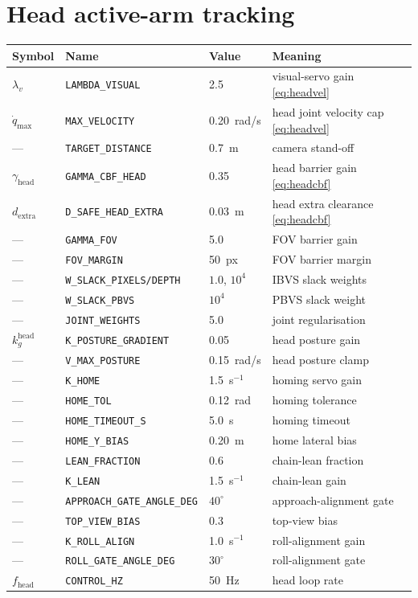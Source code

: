 \documentclass[12pt,a4paper,twoside,openright]{report}
\newcommand{\qdot}{\dot{q}}
\begin{document}
\section{Head active-arm tracking}
\begin{tabularx}{\linewidth}{@{}lllX@{}}
\toprule
Symbol & Name & Value & Meaning \\
\midrule
$\lambda_v$ & \texttt{LAMBDA\_VISUAL} & 2.5 & visual-servo gain \eqref{eq:headvel} \\
$\qdot_{\max}$ & \texttt{MAX\_VELOCITY} & 0.20~rad/s & head joint velocity cap \eqref{eq:headvel} \\
--- & \texttt{TARGET\_DISTANCE} & 0.7~m & camera stand-off \\
$\gamma_{\text{head}}$ & \texttt{GAMMA\_CBF\_HEAD} & 0.35 & head barrier gain \eqref{eq:headcbf} \\
$d_{\text{extra}}$ & \texttt{D\_SAFE\_HEAD\_EXTRA} & 0.03~m & head extra clearance \eqref{eq:headcbf} \\
--- & \texttt{GAMMA\_FOV} & 5.0 & FOV barrier gain \\
--- & \texttt{FOV\_MARGIN} & 50~px & FOV barrier margin \\
--- & \texttt{W\_SLACK\_PIXELS/DEPTH} & $1.0$, $10^{4}$ & IBVS slack weights \\
--- & \texttt{W\_SLACK\_PBVS} & $10^{4}$ & PBVS slack weight \\
--- & \texttt{JOINT\_WEIGHTS} & 5.0 & joint regularisation \\
$k_g^{\text{head}}$ & \texttt{K\_POSTURE\_GRADIENT} & 0.05 & head posture gain \\
--- & \texttt{V\_MAX\_POSTURE} & 0.15~rad/s & head posture clamp \\
--- & \texttt{K\_HOME} & 1.5~s$^{-1}$ & homing servo gain \\
--- & \texttt{HOME\_TOL} & 0.12~rad & homing tolerance \\
--- & \texttt{HOME\_TIMEOUT\_S} & 5.0~s & homing timeout \\
--- & \texttt{HOME\_Y\_BIAS} & 0.20~m & home lateral bias \\
--- & \texttt{LEAN\_FRACTION} & 0.6 & chain-lean fraction \\
--- & \texttt{K\_LEAN} & 1.5~s$^{-1}$ & chain-lean gain \\
--- & \texttt{APPROACH\_GATE\_ANGLE\_DEG} & $40^{\circ}$ & approach-alignment gate \\
--- & \texttt{TOP\_VIEW\_BIAS} & 0.3 & top-view bias \\
--- & \texttt{K\_ROLL\_ALIGN} & 1.0~s$^{-1}$ & roll-alignment gain \\
--- & \texttt{ROLL\_GATE\_ANGLE\_DEG} & $30^{\circ}$ & roll-alignment gate \\
$f_{\text{head}}$ & \texttt{CONTROL\_HZ} & 50~Hz & head loop rate \\
\bottomrule
\end{tabularx}
\end{document}
